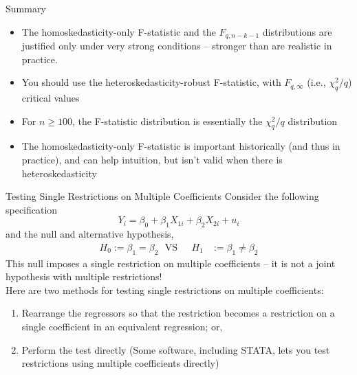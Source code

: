 \documentclass[notes,10pt, aspectratio=169]{beamer}
\begin{document}
\begin{frame}{Summary}
\begin{itemize}
    \item The homoskedasticity-only F-statistic and the $F_{q,n-k-1}$ distributions are justified only under very strong conditions – stronger than are realistic in practice.\\[1em]
    \item You should use the heteroskedasticity-robust F-statistic, with $F_{q,\infty}$ (i.e., $\chi^2_q/q$) critical values\\[1em]
    \item For $n\geq100$, the F-statistic distribution is essentially the $\chi^2_q/q$ distribution\\[1em]
    \item The homoskedasticity-only F-statistic is important historically (and thus in practice), and can help intuition, but isn’t valid when there is heteroskedasticity
\end{itemize}
\end{frame}


\begin{frame}{Testing Single Restrictions on Multiple Coefficients}
Consider the following specification
\begin{equation*}
    Y_i = \beta_0 + \beta_1 X_{1i}+ \beta_2 X_{2i} +u_i
\end{equation*}
and the null and alternative hypothesis,
\begin{eqnarray*}
    H_0 := \beta_1=\beta_2 \text{~~VS~~}  & H_1 &:= \beta_1\neq\beta_2
\end{eqnarray*}
This null imposes a single restriction on multiple coefficients – it is not a joint hypothesis with multiple restrictions!\\[1em]

Here are two methods for testing single restrictions on multiple coefficients:
\begin{enumerate}
    \item Rearrange the regressors so that the restriction becomes a restriction on a single coefficient in an equivalent regression; or,
    \item Perform the test directly (Some software, including STATA, lets you test restrictions using multiple coefficients directly)
\end{enumerate}
\end{frame}
\end{document}
